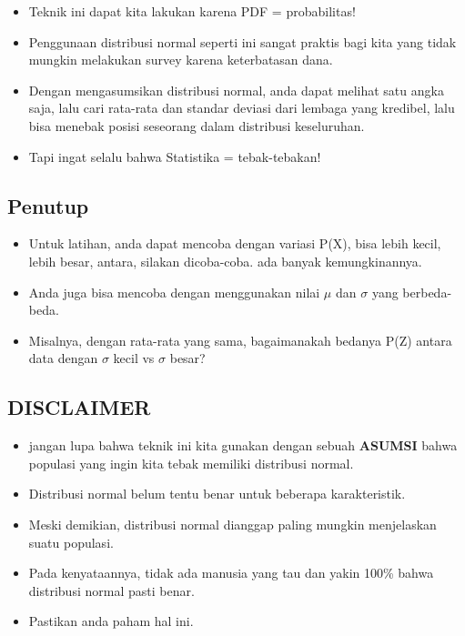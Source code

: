 \documentclass[
  letterpaper,
  DIV=11,
  numbers=noendperiod]{scrartcl}
\begin{document}
\begin{itemize}
\item
  Teknik ini dapat kita lakukan karena PDF = probabilitas!
\item
  Penggunaan distribusi normal seperti ini sangat praktis bagi kita yang
  tidak mungkin melakukan survey karena keterbatasan dana.
\item
  Dengan mengasumsikan distribusi normal, anda dapat melihat satu angka
  saja, lalu cari rata-rata dan standar deviasi dari lembaga yang
  kredibel, lalu bisa menebak posisi seseorang dalam distribusi
  keseluruhan.
\item
  Tapi ingat selalu bahwa Statistika = tebak-tebakan!
\end{itemize}

\subsection{Penutup}\label{penutup-1}

\begin{itemize}
\item
  Untuk latihan, anda dapat mencoba dengan variasi P(X), bisa lebih
  kecil, lebih besar, antara, silakan dicoba-coba. ada banyak
  kemungkinannya.
\item
  Anda juga bisa mencoba dengan menggunakan nilai \(\mu\) dan \(\sigma\)
  yang berbeda-beda.
\item
  Misalnya, dengan rata-rata yang sama, bagaimanakah bedanya P(Z) antara
  data dengan \(\sigma\) kecil vs \(\sigma\) besar?
\end{itemize}

\subsection{DISCLAIMER}\label{disclaimer}

\begin{itemize}
\item
  jangan lupa bahwa teknik ini kita gunakan dengan sebuah
  \textbf{ASUMSI} bahwa populasi yang ingin kita tebak memiliki
  distribusi normal.
\item
  Distribusi normal belum tentu benar untuk beberapa karakteristik.
\item
  Meski demikian, distribusi normal dianggap paling mungkin menjelaskan
  suatu populasi.
\item
  Pada kenyataannya, tidak ada manusia yang tau dan yakin 100\% bahwa
  distribusi normal pasti benar.
\item
  Pastikan anda paham hal ini.
\end{itemize}
\end{document}
